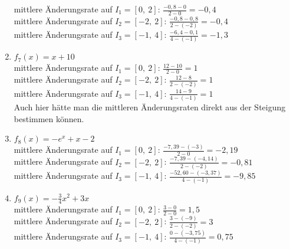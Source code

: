 \documentclass[a4paper,12pt, headsepline, ngerman]{scrartcl}
\theoremstyle{definition}
\begin{document}
\begin{Answer}[ref=grafischABlA1]
\begin{enumerate}[label=\alph*)]
		mittlere Änderungsrate auf \(I_1=[0,\ 2]\): \(\frac{-0,8-0}{2-0}=-0,4\)\\
		mittlere Änderungsrate auf \(I_2=[-2,\ 2]\): \(\frac{-0,8-0,8}{2-(-2)}=-0,4\)\\
		mittlere Änderungsrate auf \(I_3=[-1,\ 4]\): \(\frac{-6,4-0,1}{4-(-1)}=-1,3\)\\
		\item \(f_7(x)=x+10\)\\
		mittlere Änderungsrate auf \(I_1=[0,\ 2]\): \(\frac{12-10}{2-0}=1\)\\
		mittlere Änderungsrate auf \(I_2=[-2,\ 2]\): \(\frac{12-8}{2-(-2)}=1\)\\
		mittlere Änderungsrate auf \(I_3=[-1,\ 4]\): \(\frac{14-9}{4-(-1)}=1\)\\
		Auch hier hätte man die mittleren Änderungsraten direkt aus der Steigung bestimmen können.
		\item \(f_8(x)=-e^x+x-2\)\\
		mittlere Änderungsrate auf \(I_1=[0,\ 2]\): \(\frac{-7,39-(-3)}{2-0}=-2,19\)\\
		mittlere Änderungsrate auf \(I_2=[-2,\ 2]\): \(\frac{-7,39-(-4,14)}{2-(-2)}=-0,81\)\\
		mittlere Änderungsrate auf \(I_3=[-1,\ 4]\): \(\frac{-52,60-(-3,37)}{4-(-1)}=-9,85\)\\
		\item \(f_9(x)=-\frac{3}{4}x^2+3x\)\\
		mittlere Änderungsrate auf \(I_1=[0,\ 2]\): \(\frac{3-0}{2-0}=1,5\)\\
		mittlere Änderungsrate auf \(I_2=[-2,\ 2]\): \(\frac{3-(-9)}{2-(-2)}=3\)\\
		mittlere Änderungsrate auf \(I_3=[-1,\ 4]\): \(\frac{0-(-3,75)}{4-(-1)}=0,75\)\\
	\end{enumerate}
\end{Answer}

\end{document}
